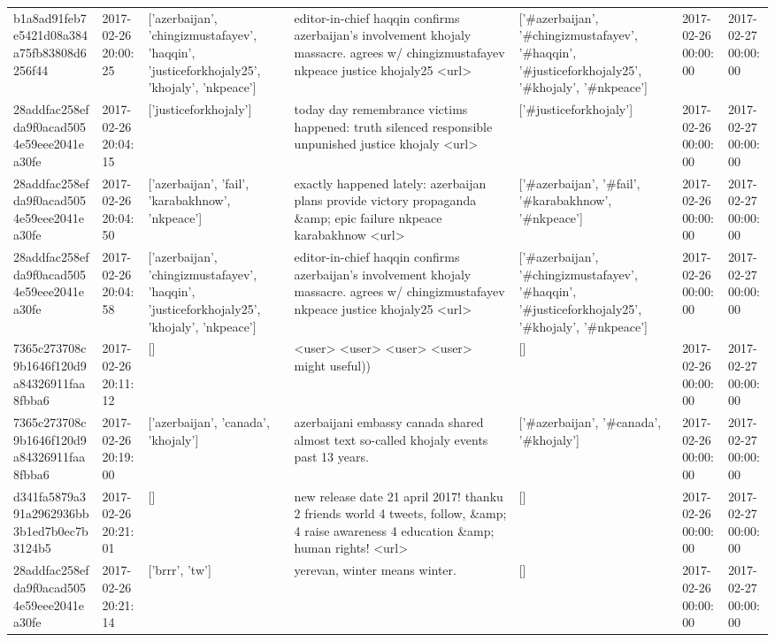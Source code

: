 \begin{tabular}{lllllll}
b1a8ad91feb7e5421d08a384a75fb83808d6256f44 & 2017-02-26 20:00:25 & ['azerbaijan', 'chingizmustafayev', 'haqqin', 'justiceforkhojaly25', 'khojaly', 'nkpeace'] & editor-in-chief haqqin confirms azerbaijan's involvement khojaly massacre. agrees w/ chingizmustafayev nkpeace justice khojaly25 <url> & ['#azerbaijan', '#chingizmustafayev', '#haqqin', '#justiceforkhojaly25', '#khojaly', '#nkpeace'] & 2017-02-26 00:00:00 & 2017-02-27 00:00:00 \\
28addfac258efda9f0acad5054e59eee2041ea30fe & 2017-02-26 20:04:15 & ['justiceforkhojaly'] & today day remembrance victims happened: truth silenced responsible unpunished justice khojaly <url> & ['#justiceforkhojaly'] & 2017-02-26 00:00:00 & 2017-02-27 00:00:00 \\
28addfac258efda9f0acad5054e59eee2041ea30fe & 2017-02-26 20:04:50 & ['azerbaijan', 'fail', 'karabakhnow', 'nkpeace'] & exactly happened lately: azerbaijan plans provide victory propaganda \&amp; epic failure nkpeace karabakhnow <url> & ['#azerbaijan', '#fail', '#karabakhnow', '#nkpeace'] & 2017-02-26 00:00:00 & 2017-02-27 00:00:00 \\
28addfac258efda9f0acad5054e59eee2041ea30fe & 2017-02-26 20:04:58 & ['azerbaijan', 'chingizmustafayev', 'haqqin', 'justiceforkhojaly25', 'khojaly', 'nkpeace'] & editor-in-chief haqqin confirms azerbaijan's involvement khojaly massacre. agrees w/ chingizmustafayev nkpeace justice khojaly25 <url> & ['#azerbaijan', '#chingizmustafayev', '#haqqin', '#justiceforkhojaly25', '#khojaly', '#nkpeace'] & 2017-02-26 00:00:00 & 2017-02-27 00:00:00 \\
7365c273708c9b1646f120d9a84326911faa8fbba6 & 2017-02-26 20:11:12 & [] & <user> <user> <user> <user> might useful)) & [] & 2017-02-26 00:00:00 & 2017-02-27 00:00:00 \\
7365c273708c9b1646f120d9a84326911faa8fbba6 & 2017-02-26 20:19:00 & ['azerbaijan', 'canada', 'khojaly'] & azerbaijani embassy canada shared almost text so-called khojaly events past 13 years. & ['#azerbaijan', '#canada', '#khojaly'] & 2017-02-26 00:00:00 & 2017-02-27 00:00:00 \\
d341fa5879a391a2962936bb3b1ed7b0ec7b3124b5 & 2017-02-26 20:21:01 & [] & new release date 21 april 2017! thanku 2 friends world 4 tweets, follow, \&amp; 4 raise awareness 4 education \&amp; human rights! <url> & [] & 2017-02-26 00:00:00 & 2017-02-27 00:00:00 \\
28addfac258efda9f0acad5054e59eee2041ea30fe & 2017-02-26 20:21:14 & ['brrr', 'tw'] & yerevan, winter means winter. & [] & 2017-02-26 00:00:00 & 2017-02-27 00:00:00 \\

\end{tabular}

